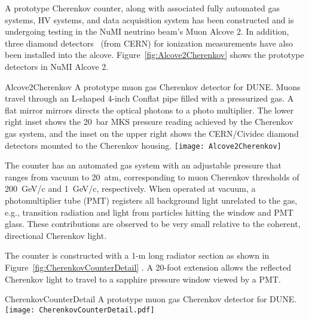 A prototype Cherenkov counter, along with associated fully automated
gas systems, HV systems, and data acquisition system has been
constructed and is undergoing testing in the NuMI neutrino beam's Muon
Alcove 2. In addition, three diamond detectors~\cite{ref:CERNdiamond} (from CERN)
for ionization measurements have also been installed into the alcove. 
Figure~\ref{fig:Alcove2Cherenkov} shows the prototype detectors in
NuMI Alcove 2.
\begin{cdrfigure}{Alcove2Cherenkov}
{A prototype muon gas Cherenkov detector for DUNE.
Muons travel through an L-shaped 4-inch Conflat pipe filled with a
pressurized gas. A flat mirror mirrors directs the optical photons
to a photo multiplier. The lower right inset shows the 20~bar MKS
pressure reading achieved by the Cherenkov gas system, and the inset
on the upper right shows the CERN/Cividec diamond detectors mounted to the Cherenkov housing.}
\texttt{[image: Alcove2Cherenkov]}
\end{cdrfigure}

The counter has an automated gas system with an adjustable %
pressure that
ranges from vacuum to 20~atm, corresponding to muon Cherenkov
thresholds of 200~GeV/c and 1~GeV/c, respectively. When operated at
vacuum, a photomultiplier tube (PMT) registers all background light unrelated to the gas,
e.g., transition radiation and light from particles hitting the window and
PMT glass.  These contributions are observed to be very small relative
to the coherent, directional Cherenkov light.

The counter is constructed with a 1-m long radiator section as shown
in Figure~\ref{fig:CherenkovCounterDetail} . A 20-foot extension
allows the reflected Cherenkov light to travel to a sapphire pressure
window viewed by a PMT.
\begin{cdrfigure}{CherenkovCounterDetail}
{A prototype muon gas Cherenkov detector for DUNE.  }
\texttt{[image: CherenkovCounterDetail.pdf]}
\end{cdrfigure}


